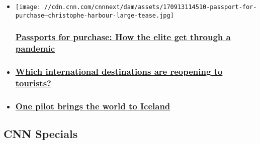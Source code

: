 \begin{itemize}
\item
  \href{/travel/article/buying-multiple-passports-pandemic/index.html}{}

  \texttt{[image: //cdn.cnn.com/cnnnext/dam/assets/170913114510-passport-for-purchase---christophe-harbour-large-tease.jpg]}

  \hypertarget{passports-for-purchase-how-the-elite-get-through-a-pandemic-}{%
  \subsubsection{\texorpdfstring{\href{/travel/article/buying-multiple-passports-pandemic/index.html}{Passports
  for purchase: How the elite get through a pandemic
  }}{Passports for purchase: How the elite get through a pandemic }}\label{passports-for-purchase-how-the-elite-get-through-a-pandemic-}}
\item
  \hypertarget{which-international-destinations-are-reopening-to-tourists-1}{%
  \subsubsection{\texorpdfstring{\href{/travel/article/global-destinations-reopening-to-tourists/index.html}{Which
  international destinations are reopening to
  tourists?}}{Which international destinations are reopening to tourists?}}\label{which-international-destinations-are-reopening-to-tourists-1}}
\item
  \hypertarget{one-pilot-brings-the-world-to-iceland}{%
  \subsubsection{\texorpdfstring{\href{/travel/article/iceland-helicopter-pilot-flyover/index.html}{One
  pilot brings the world to
  Iceland}}{One pilot brings the world to Iceland}}\label{one-pilot-brings-the-world-to-iceland}}
\end{itemize}

\hypertarget{cnn-specials-}{%
\subsection{CNN Specials~}\label{cnn-specials-}}

